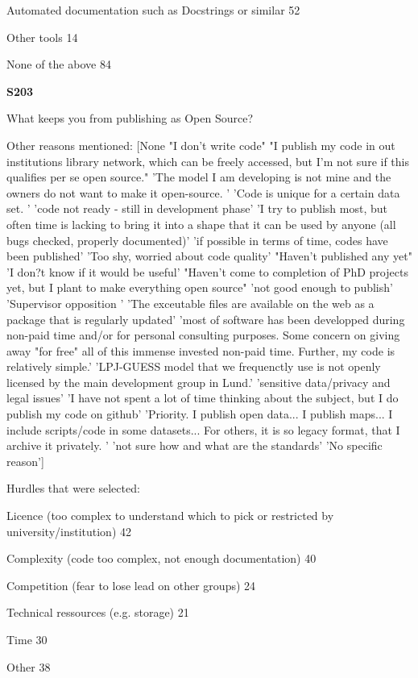  Automated documentation such as Docstrings or similar 52

 Other tools 14

None of the above 84

\textbf{S203}

What keeps you from publishing as Open Source?

Other reasons mentioned: [None "I don't write code"
 "I publish my code in out institutions library network, which can be freely accessed, but I'm not sure if this qualifies per se open source."
 'The model I am developing is not mine and the owners do not want to make it open-source. '
 'Code is unique for a certain data set. '
 'code not ready - still in development phase'
 'I try to publish most, but often time is lacking to bring it into a shape that it can be used by anyone (all bugs checked, properly documented)'
 'if possible in terms of time, codes have been published'
 'Too shy, worried about code quality' "Haven't published any yet"
 'I don?t know if it would be useful'
 "Haven't come to completion of PhD projects yet, but I plant to make everything open source"
 'not good enough to publish' 'Supervisor opposition '
 'The exceutable files are available on the web as a package that is regularly updated'
 'most of software has been developped during non-paid time and/or for personal consulting purposes. Some concern on giving away "for free" all of this immense invested non-paid time. Further, my code is relatively simple.'
 'LPJ-GUESS model that we frequenctly use is not openly licensed by the main development group in Lund.'
 'sensitive data/privacy and legal issues'
 'I have not spent a lot of time thinking about the subject, but I do publish my code on github'
 'Priority. I publish open data... I publish maps... I include scripts/code in some datasets... For others, it is so legacy format, that I archive it privately. '
 'not sure how and what are the standards' 'No specific reason']


Hurdles that were selected: 

 Licence (too complex to understand which to pick or restricted by university/institution) 42

 Complexity (code too complex, not enough documentation) 40

 Competition (fear to lose lead on other groups) 24

 Technical ressources (e.g. storage) 21

 Time 30

 Other 38

